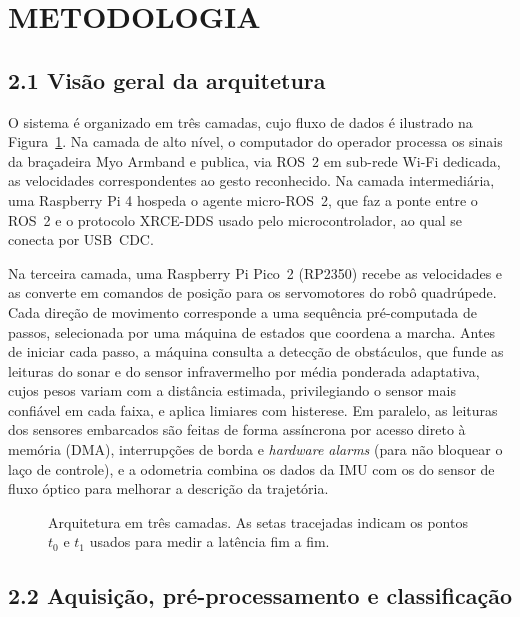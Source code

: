 \documentclass[12pt,a4paper]{article}
\begin{document}
\section{METODOLOGIA}

\subsection*{2.1 Visão geral da arquitetura}

O sistema é organizado em três camadas, cujo fluxo de dados é ilustrado
na Figura~\ref{fig:arquitetura}. Na camada de alto nível, o computador
do operador processa os sinais da braçadeira Myo Armband e publica, via
ROS~2 em sub-rede Wi-Fi dedicada, as velocidades correspondentes ao
gesto reconhecido. Na camada
intermediária, uma Raspberry Pi 4 hospeda o agente
micro-ROS~2, que faz a ponte entre o ROS~2
e o protocolo XRCE-DDS usado pelo microcontrolador, ao qual se conecta
por USB~CDC.

Na terceira camada, uma Raspberry Pi Pico~2 (RP2350) recebe as
velocidades e as converte em comandos de posição para os servomotores
do robô quadrúpede. Cada direção de movimento corresponde a uma
sequência pré-computada de passos, selecionada por uma máquina de
estados que coordena a marcha. Antes de iniciar cada passo, a máquina
consulta a detecção de obstáculos, que funde as leituras do sonar e do
sensor infravermelho por média ponderada adaptativa, cujos pesos
variam com a distância estimada, privilegiando o sensor mais confiável
em cada faixa, e aplica limiares com histerese. Em paralelo, as leituras dos sensores embarcados são feitas
de forma assíncrona por acesso direto à memória (DMA),
interrupções de borda e \textit{hardware alarms} (para não bloquear
o laço de controle), e a odometria combina os dados da IMU com os do
sensor de fluxo óptico para melhorar a descrição da trajetória.


\begin{figure}[htbp]
\centering
\caption{Arquitetura em três camadas. As setas tracejadas indicam os pontos
$t_0$ e $t_1$ usados para medir a latência fim a fim.}
\label{fig:arquitetura}
\end{figure}

\subsection*{2.2 Aquisição, pré-processamento e classificação}
\end{document}
